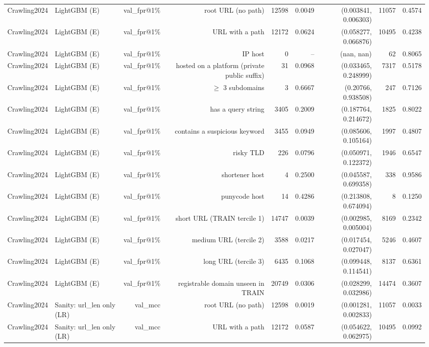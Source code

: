\begin{table}[t]
\begin{tabular}{llrrrrrrr}
Crawling2024 & LightGBM (E) & val\_fpr@1\% & root URL (no path) & 12598 & 0.0049 & (0.003841, 0.006303) & 11057 & 0.4574 \\
Crawling2024 & LightGBM (E) & val\_fpr@1\% & URL with a path & 12172 & 0.0624 & (0.058277, 0.066876) & 10495 & 0.4238 \\
Crawling2024 & LightGBM (E) & val\_fpr@1\% & IP host & 0 & -- & (nan, nan) & 62 & 0.8065 \\
Crawling2024 & LightGBM (E) & val\_fpr@1\% & hosted on a platform (private public suffix) & 31 & 0.0968 & (0.033465, 0.248999) & 7317 & 0.5178 \\
Crawling2024 & LightGBM (E) & val\_fpr@1\% & $\geq$ 3 subdomains & 3 & 0.6667 & (0.20766, 0.938508) & 247 & 0.7126 \\
Crawling2024 & LightGBM (E) & val\_fpr@1\% & has a query string & 3405 & 0.2009 & (0.187764, 0.214672) & 1825 & 0.8022 \\
Crawling2024 & LightGBM (E) & val\_fpr@1\% & contains a suspicious keyword & 3455 & 0.0949 & (0.085606, 0.105164) & 1997 & 0.4807 \\
Crawling2024 & LightGBM (E) & val\_fpr@1\% & risky TLD & 226 & 0.0796 & (0.050971, 0.122372) & 1946 & 0.6547 \\
Crawling2024 & LightGBM (E) & val\_fpr@1\% & shortener host & 4 & 0.2500 & (0.045587, 0.699358) & 338 & 0.9586 \\
Crawling2024 & LightGBM (E) & val\_fpr@1\% & punycode host & 14 & 0.4286 & (0.213808, 0.674094) & 8 & 0.1250 \\
Crawling2024 & LightGBM (E) & val\_fpr@1\% & short URL (TRAIN tercile 1) & 14747 & 0.0039 & (0.002985, 0.005004) & 8169 & 0.2342 \\
Crawling2024 & LightGBM (E) & val\_fpr@1\% & medium URL (tercile 2) & 3588 & 0.0217 & (0.017454, 0.027047) & 5246 & 0.4607 \\
Crawling2024 & LightGBM (E) & val\_fpr@1\% & long URL (tercile 3) & 6435 & 0.1068 & (0.099448, 0.114541) & 8137 & 0.6361 \\
Crawling2024 & LightGBM (E) & val\_fpr@1\% & registrable domain unseen in TRAIN & 20749 & 0.0306 & (0.028299, 0.032986) & 14474 & 0.3607 \\
Crawling2024 & Sanity: url\_len only (LR) & val\_mcc & root URL (no path) & 12598 & 0.0019 & (0.001281, 0.002833) & 11057 & 0.0033 \\
Crawling2024 & Sanity: url\_len only (LR) & val\_mcc & URL with a path & 12172 & 0.0587 & (0.054622, 0.062975) & 10495 & 0.0992 \\

\end{tabular}
\end{table}
